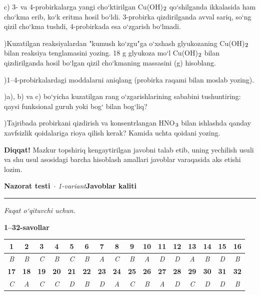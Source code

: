 \documentclass[11pt,a4paper]{article}
\renewcommand{\textsubscript}[1]{\ensuremath{_{\text{\fontsize{8}{8}\selectfont #1}}}}
\newcommand{\diqqat}[1]{\par\smallskip\noindent\textbf{Diqqat!} #1\par\medskip}
\begin{document}
c) 3- va 4-probirkalarga yangi cho`ktirilgan Cu(OH)\textsubscript{2} qo`shilganda ikkalasida ham cho`kma erib, ko`k eritma hosil bo`ldi. 3-probirka qizdirilganda avval sariq, so`ng qizil cho`kma tushdi, 4-probirkada esa o`zgarish bo`lmadi.\par
{})Kuzatilgan reaksiyalardan "kumush ko`zgu"ga o`xshash glyukozaning Cu(OH)\textsubscript{2} bilan reaksiya tenglamasini yozing. 18 g glyukoza mo`l Cu(OH)\textsubscript{2} bilan qizdirilganda hosil bo`lgan qizil cho`kmaning massasini (g) hisoblang.\par
{})1--4-probirkalardagi moddalarni aniqlang (probirka raqami bilan moslab yozing).\par
{})a), b) va c) bo`yicha kuzatilgan rang o`zgarishlarining sababini tushuntiring: qaysi funksional guruh yoki bog` bilan bog`liq?\par
{})Tajribada probirkani qizdirish va konsentrlangan HNO\textsubscript{3} bilan ishlashda qanday xavfsizlik qoidalariga rioya qilish kerak? Kamida uchta qoidani yozing.\par
\diqqat{Mazkur topshiriq kengaytirilgan javobni talab etib, uning yechilish usuli va shu usul asosidagi barcha hisoblash amallari javoblar varaqasida aks etishi lozim.}
\newpage
\noindent\textbf{\fontsize{13}{15}\selectfont Nazorat testi}\ \textit{$\cdot$ 1-variant}\hfill \textbf{Javoblar kaliti}\par\smallskip\hrule\smallskip
\textit{Faqat o`qituvchi uchun.}\par\medskip
\noindent\textbf{1--32-savollar}\par\smallskip
\noindent\begin{tabular}{|c|c|c|c|c|c|c|c|c|c|c|c|c|c|c|c|}\hline
\textbf{1} & \textbf{2} & \textbf{3} & \textbf{4} & \textbf{5} & \textbf{6} & \textbf{7} & \textbf{8} & \textbf{9} & \textbf{10} & \textbf{11} & \textbf{12} & \textbf{13} & \textbf{14} & \textbf{15} & \textbf{16}\\\hline
\textsl{B} & \textsl{B} & \textsl{C} & \textsl{B} & \textsl{C} & \textsl{B} & \textsl{A} & \textsl{C} & \textsl{B} & \textsl{A} & \textsl{D} & \textsl{D} & \textsl{A} & \textsl{B} & \textsl{D} & \textsl{B}\\\hline
\textbf{17} & \textbf{18} & \textbf{19} & \textbf{20} & \textbf{21} & \textbf{22} & \textbf{23} & \textbf{24} & \textbf{25} & \textbf{26} & \textbf{27} & \textbf{28} & \textbf{29} & \textbf{30} & \textbf{31} & \textbf{32}\\\hline
\textsl{C} & \textsl{A} & \textsl{C} & \textsl{C} & \textsl{D} & \textsl{B} & \textsl{D} & \textsl{A} & \textsl{C} & \textsl{B} & \textsl{A} & \textsl{D} & \textsl{C} & \textsl{D} & \textsl{D} & \textsl{B}\\\hline
\end{tabular}\par\medskip
\end{document}
